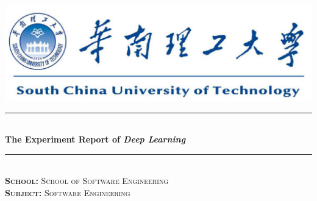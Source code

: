 \documentclass[journal, a4paper]{IEEEtran}
\begin{document}
\begin{titlepage}

\newcommand{\HRule}{\rule{\linewidth}{0.5mm}} %

\center %

~\\[1cm]
\includegraphics{SCUT.png}\\[2cm] %


\HRule \\[1cm]
{ \huge \bfseries The Experiment Report of \textit{Deep Learning} }\\[0.6cm] %
\HRule \\[2cm]


\textsc{\LARGE \textbf{School:} School of Software Engineering}\\[1cm]
\textsc{\LARGE \textbf{Subject:} Software Engineering}\\[2cm]




\end{titlepage}
\end{document}
